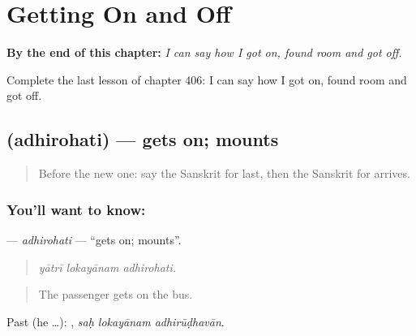 
\chapter{Getting On and Off}
\label{ch:sa-getting-on-and-off}

\begin{chapteropening}
\textbf{By the end of this chapter:} \emph{I can say how I got on, found room and got off.}

Complete the last lesson of chapter 406: I can say how I got on, found room and got off.
\end{chapteropening}

\section[\texorpdfstring{\sk{अधिरोहति} (adhirohati)}{अधिरोहति (adhirohati)}]{ (adhirohati) — gets on; mounts}

\label{lesson:SA-C406-adhirohati}



\begin{quote}
Before the new one: say the Sanskrit for last, then the Sanskrit for arrives.
\end{quote}

\subsection*{You'll want to know: }
\textbf{} — \emph{adhirohati} — \textquotedblleft{}gets on; mounts\textquotedblright{}.

\begin{quote}
  
\end{quote}

\begin{quote}
\emph{yātrī lokayānam adhirohati.}
\end{quote}

\begin{quote}
The passenger gets on the bus.
\end{quote}

Past (he …):   , \emph{saḥ lokayānam adhirūḍhavān}.

